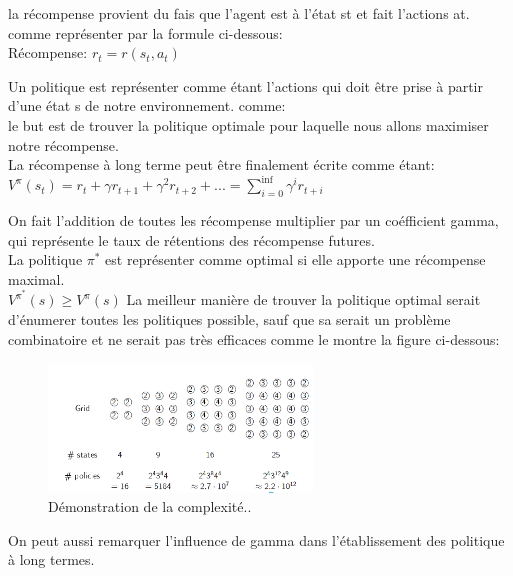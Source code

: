 \documentclass[oneside]{book}
\begin{document}
\justify
la récompense provient du fais que l'agent est à l'état st et fait l'actions at. comme représenter par la formule ci-dessous:\\

\centering
Récompense: $r_t = r(s_t,a_t)$

\justify

Un politique est représenter comme étant l'actions qui doit être prise à partir d'une état s de notre environnement. comme:\\


le but est de trouver la politique optimale pour laquelle nous allons maximiser notre récompense.\\

La récompense à long terme peut être finalement écrite comme étant:\\

\centering
$V^{\pi}(s_t) = r_t + \gamma r_{t+1} + \gamma^2 r_{t+2} + ... = \sum\limits_{i=0}^{\inf} \gamma^i r_{t+i}$\\

\justify

On fait l'addition de toutes les récompense multiplier par un coéfficient gamma, qui représente le taux de rétentions des récompense futures.\\

La politique $\pi^*$ est représenter comme optimal si elle apporte une récompense maximal.\\

\centering
$V^{\pi^*}(s) \geq V^{\pi}(s)$
\justify
La meilleur manière de trouver la politique optimal serait d'énumerer toutes les politiques possible, sauf que sa serait un problème combinatoire et ne serait pas très efficaces comme le montre la figure ci-dessous:\\

\begin{figure}[!ht]
\centering
\includegraphics[width = 7cm]{politique_optimal.png}
\caption{Démonstration de la complexité..}
\end{figure}

On peut aussi remarquer l'influence de gamma dans l'établissement des politique à long termes. \\
\end{document}
